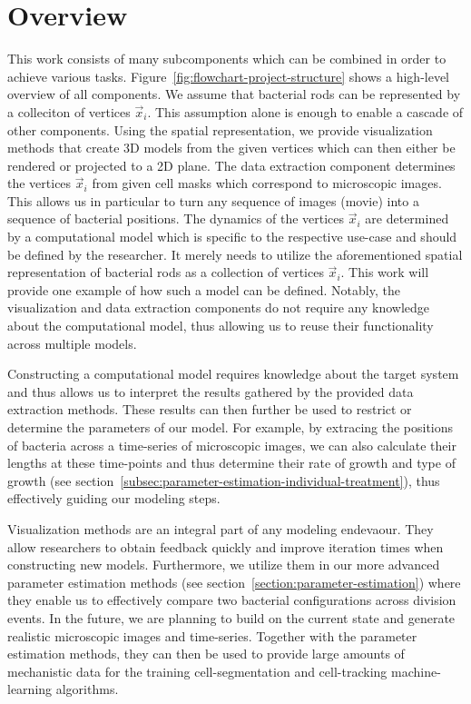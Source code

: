 \documentclass{article}
\begin{document}
\section{Overview}
This work consists of many subcomponents which can be combined in order to achieve various tasks.
Figure~\ref{fig:flowchart-project-structure} shows a high-level overview of all components.
We assume that bacterial rods can be represented by a colleciton of vertices $\vec{x}_i$.
This assumption alone is enough to enable a cascade of other components.
Using the spatial representation, we provide visualization methods that create 3D models from the
given vertices which can then either be rendered or projected to a 2D plane.
The data extraction component determines the vertices $\vec{x}_i$ from given cell masks which
correspond to microscopic images.
This allows us in particular to turn any sequence of images (movie) into a sequence of bacterial
positions.
The dynamics of the vertices $\vec{x}_i$ are determined by a computational model which is specific
to the respective use-case and should be defined by the researcher.
It merely needs to utilize the aforementioned spatial representation of bacterial rods as a
collection of vertices $\vec{x}_i$.
This work will provide one example of how such a model can be defined.
Notably, the visualization and data extraction components do not require any knowledge about the
computational model, thus allowing us to reuse their functionality across multiple models.

Constructing a computational model requires knowledge about the target system and thus allows us to
interpret the results gathered by the provided data extraction methods.
These results can then further be used to restrict or determine the parameters of our model.
For example, by extracing the positions of bacteria across a time-series of microscopic images, we
can also calculate their lengths at these time-points and thus determine their rate of growth and
type of growth (see section~\ref{subsec:parameter-estimation-individual-treatment}), thus
effectively guiding our modeling steps.

Visualization methods are an integral part of any modeling endevaour.
They allow researchers to obtain feedback quickly and improve iteration times when constructing new
models.
Furthermore, we utilize them in our more advanced parameter estimation methods (see
section~\ref{section:parameter-estimation}) where they enable us to effectively compare
two bacterial configurations across division events.
In the future, we are planning to build on the current state and generate realistic microscopic
images and time-series.
Together with the parameter estimation methods, they can then be used to provide large amounts of
mechanistic data for the training cell-segmentation and cell-tracking machine-learning algorithms.
\end{document}
